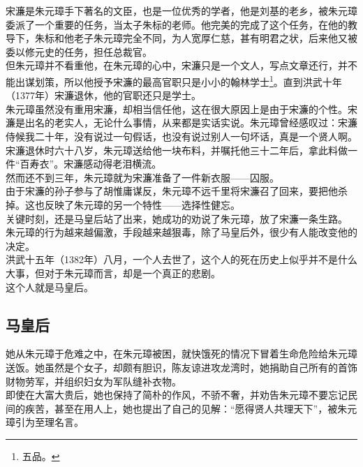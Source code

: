 \begin{multicols}{\theparacolNo}
宋濂是朱元璋手下著名的文臣，也是一位优秀的学者，他是刘基的老乡，被朱元璋委派了一个重要的任务，当太子朱标的老师。他完美的完成了这个任务，在他的教导下，朱标和他老子朱元璋完全不同，为人宽厚仁慈，甚有明君之状，后来他又被委以修元史的任务，担任总裁官。\\

但朱元璋并不看重他，在朱元璋的心中，宋濂只是一个文人，写点文章还行，并不能出谋划策，所以他授予宋濂的最高官职只是小小的翰林学士\footnote{五品。}。直到洪武十年（1377年）宋濂退休，他的官职还只是学士。\\

朱元璋虽然没有重用宋濂，却相当信任他，这在很大原因上是由于宋濂的个性。宋濂是出名的老实人，无论什么事情，从来都是实话实说。朱元璋曾经感叹过：宋濂侍候我二十年，没有说过一句假话，也没有说过别人一句坏话，真是一个贤人啊。\\

宋濂退休时六十八岁，朱元璋送给他一块布料，并嘱托他三十二年后，拿此料做一件“百寿衣”。宋濂感动得老泪横流。\\

然而还不到三年，朱元璋就为宋濂准备了一件新衣服——囚服。\\

由于宋濂的孙子参与了胡惟庸谋反，朱元璋不远千里将宋濂召了回来，要把他杀掉。这也反映了朱元璋的另一个特性——选择性健忘。\\

关键时刻，还是马皇后站了出来，她成功的劝说了朱元璋，放了宋濂一条生路。\\

朱元璋的行为越来越偏激，手段越来越狠毒，除了马皇后外，很少有人能改变他的决定。\\

洪武十五年（1382年）八月，一个人去世了，这个人的死在历史上似乎并不是什么大事，但对于朱元璋而言，却是一个真正的悲剧。\\

这个人就是马皇后。\\

\subsection{马皇后}
她从朱元璋于危难之中，在朱元璋被困，就快饿死的情况下冒着生命危险给朱元璋送饭。她虽然是个女子，却颇有胆识，陈友谅进攻龙湾时，她捐助自己所有的首饰财物劳军，并组织妇女为军队缝补衣物。\\

即使在大富大贵后，她也保持了简朴的作风，不骄不奢，并劝告朱元璋不要忘记民间的疾苦，甚至在用人上，她也提出了自己的见解：“愿得贤人共理天下”，被朱元璋引为至理名言。\\


\end{multicols}
